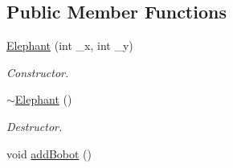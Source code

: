 \subsection*{Public Member Functions}
\begin{DoxyCompactItemize}
\item 
\hyperlink{classElephant_a581d01caaa767f869ebb68c1d9e6017b}{Elephant} (int \-\_\-x, int \-\_\-y)
\begin{DoxyCompactList}\small\item\em Constructor. \end{DoxyCompactList}\item 
\hypertarget{classElephant_a8f290b4b7acfed8f2f23bab9326ece3f}{\hyperlink{classElephant_a8f290b4b7acfed8f2f23bab9326ece3f}{$\sim$\-Elephant} ()}\label{classElephant_a8f290b4b7acfed8f2f23bab9326ece3f}

\begin{DoxyCompactList}\small\item\em Destructor. \end{DoxyCompactList}\item 
\hypertarget{classElephant_afafffb9d73c45d0100e15ec9c6c914a9}{void \hyperlink{classElephant_afafffb9d73c45d0100e15ec9c6c914a9}{add\-Bobot} ()}\label{classElephant_afafffb9d73c45d0100e15ec9c6c914a9}


\end{DoxyCompactItemize}
